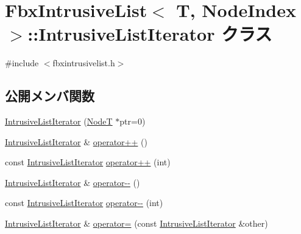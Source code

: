 \hypertarget{class_fbx_intrusive_list_1_1_intrusive_list_iterator}{}\section{Fbx\+Intrusive\+List$<$ T, Node\+Index $>$\+:\+:Intrusive\+List\+Iterator クラス}
\label{class_fbx_intrusive_list_1_1_intrusive_list_iterator}


{\ttfamily \#include $<$fbxintrusivelist.\+h$>$}

\subsection*{公開メンバ関数}
\begin{DoxyCompactItemize}
\item 
\hyperlink{class_fbx_intrusive_list_1_1_intrusive_list_iterator_a69f65667269661a51103f7c8bc8bffac}{Intrusive\+List\+Iterator} (\hyperlink{class_fbx_intrusive_list_a6ffda382a6d029a042cbb0110853680c}{NodeT} $\ast$ptr=0)
\item 
\hyperlink{class_fbx_intrusive_list_1_1_intrusive_list_iterator}{Intrusive\+List\+Iterator} \& \hyperlink{class_fbx_intrusive_list_1_1_intrusive_list_iterator_a2a0d6f2ae7ee5c706f7416555c1961e7}{operator++} ()
\item 
const \hyperlink{class_fbx_intrusive_list_1_1_intrusive_list_iterator}{Intrusive\+List\+Iterator} \hyperlink{class_fbx_intrusive_list_1_1_intrusive_list_iterator_adb4a679670dae7314e4127751d583b4a}{operator++} (int)
\item 
\hyperlink{class_fbx_intrusive_list_1_1_intrusive_list_iterator}{Intrusive\+List\+Iterator} \& \hyperlink{class_fbx_intrusive_list_1_1_intrusive_list_iterator_a4e2124e583c78c84dfe33edbdc44212d}{operator-\/-\/} ()
\item 
const \hyperlink{class_fbx_intrusive_list_1_1_intrusive_list_iterator}{Intrusive\+List\+Iterator} \hyperlink{class_fbx_intrusive_list_1_1_intrusive_list_iterator_a7afb5eb0843b79c64a8fbe87b604a651}{operator-\/-\/} (int)
\item 
\hyperlink{class_fbx_intrusive_list_1_1_intrusive_list_iterator}{Intrusive\+List\+Iterator} \& \hyperlink{class_fbx_intrusive_list_1_1_intrusive_list_iterator_aea5cf4fe46c0094874ddd5ee8d356903}{operator=} (const \hyperlink{class_fbx_intrusive_list_1_1_intrusive_list_iterator}{Intrusive\+List\+Iterator} \&other)
\item 

\end{DoxyCompactItemize}
